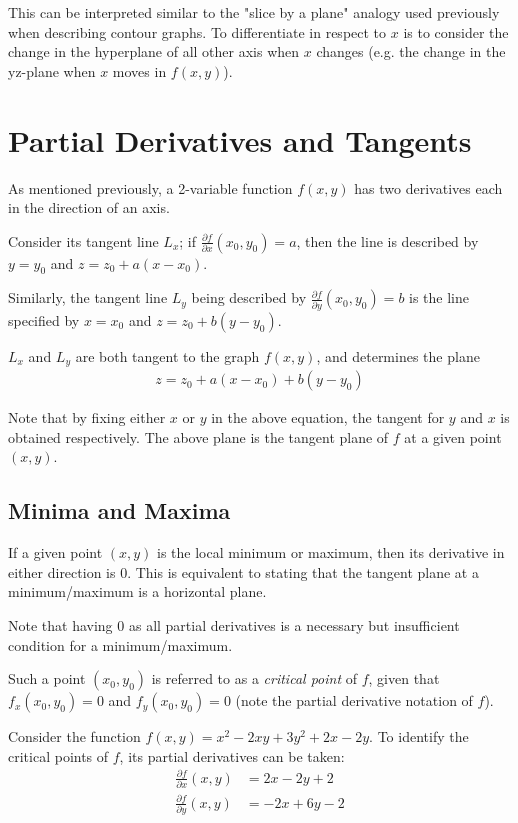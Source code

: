 \documentclass[12pt]{article}
\theoremstyle{definition}
\begin{document}
	This can be interpreted similar to the "slice by a plane" analogy used previously when describing contour graphs. To differentiate in respect to $x$ is to consider the change in the hyperplane of all other axis when $x$ changes (e.g. the change in the yz-plane when $x$ moves in $f(x, y)$).
	
	\section{Partial Derivatives and Tangents}
	
	As mentioned previously, a 2-variable function $f(x, y)$ has two derivatives each in the direction of an axis.
	
	Consider its tangent line $L_x$; if $\frac{\partial f}{\partial x}(x_0, y_0) = a$, then the line is described by $y = y_0$ and $z = z_0 + a(x - x_0)$.
	
	Similarly, the tangent line $L_y$ being described by $\frac{\partial f}{\partial y}(x_0, y_0) = b$ is the line specified by $x = x_0$ and $z = z_0 + b(y - y_0)$.
	
	$L_x$ and $L_y$ are both tangent to the graph $f(x, y)$, and determines the plane
	\begin{gather*}
		z = z_0 + a(x - x_0) + b(y - y_0)
	\end{gather*}
	
	Note that by fixing either $x$ or $y$ in the above equation, the tangent for $y$ and $x$ is obtained respectively. The above plane is the tangent plane of $f$ at a given point $(x, y)$.
	
	\subsection{Minima and Maxima}
	
	If a given point $(x, y)$ is the local minimum or maximum, then its derivative in either direction is $0$. This is equivalent to stating that the tangent plane at a minimum/maximum is a horizontal plane.
	
	Note that having $0$ as all partial derivatives is a necessary but insufficient condition for a minimum/maximum.
	
	Such a point $(x_0, y_0)$ is referred to as a \emph{critical point} of $f$, given that $f_x(x_0, y_0) = 0$ and $f_y(x_0, y_0) = 0$ (note the partial derivative notation of $f$).
	
	Consider the function $f(x, y) = x^2 - 2xy + 3y^2 + 2x - 2y$. To identify the critical points of $f$, its partial derivatives can be taken:
	\begin{align*}
		\frac{\partial f}{\partial x}(x, y) &= 2x - 2y + 2 \\
		\frac{\partial f}{\partial y}(x, y) &= -2x + 6y - 2
	\end{align*}
	
\end{document}
